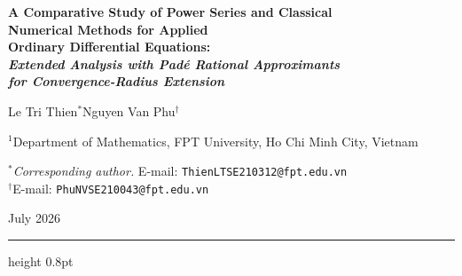 \documentclass[12pt,a4paper]{article}
\theoremstyle{definition}
\theoremstyle{remark}
\begin{document}
\begin{center}
  {\LARGE\bfseries
    A Comparative Study of Power Series and Classical\\[4pt]
   Numerical Methods for Applied\\[4pt]
   Ordinary Differential Equations:\\[6pt]
   \large\itshape
   Extended Analysis with Padé Rational Approximants\\
   for Convergence-Radius Extension}

  \vspace{18pt}

  {\large
    Le Tri Thien$^{\ast}$\quad Nguyen Van Phu$^{\dagger}$}

  \vspace{8pt}

  {\normalsize
    $^{1}$Department of Mathematics, FPT University,
    Ho Chi Minh City, Vietnam}

  \vspace{4pt}

  {\small
    ${}^{\ast}$\textit{Corresponding author.}
    E-mail: \texttt{ThienLTSE210312@fpt.edu.vn}\\[2pt]
    ${}^{\dagger}$E-mail: \texttt{PhuNVSE210043@fpt.edu.vn}}

  \vspace{10pt}
  {\small July 2026}
\end{center}

\hrule height 0.8pt
\vspace{10pt}
\end{document}
